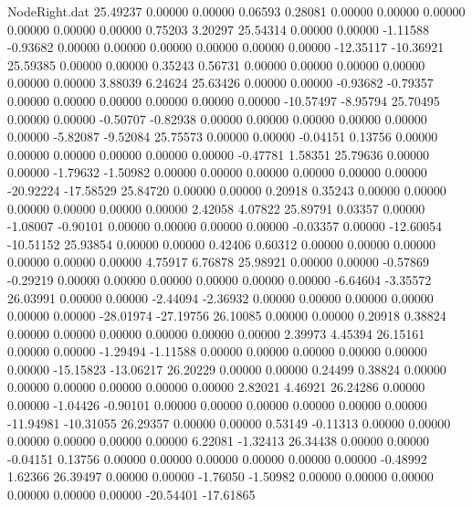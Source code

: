 \begin{filecontents}{NodeRight.dat}
  25.49237    0.00000    0.00000     0.06593    0.28081    0.00000    0.00000    0.00000    0.00000    0.00000    0.00000    0.75203    3.20297
  25.54314    0.00000    0.00000    -1.11588   -0.93682    0.00000    0.00000    0.00000    0.00000    0.00000    0.00000  -12.35117  -10.36921
  25.59385    0.00000    0.00000     0.35243    0.56731    0.00000    0.00000    0.00000    0.00000    0.00000    0.00000    3.88039    6.24624
  25.63426    0.00000    0.00000    -0.93682   -0.79357    0.00000    0.00000    0.00000    0.00000    0.00000    0.00000  -10.57497   -8.95794
  25.70495    0.00000    0.00000    -0.50707   -0.82938    0.00000    0.00000    0.00000    0.00000    0.00000    0.00000   -5.82087   -9.52084
  25.75573    0.00000    0.00000    -0.04151    0.13756    0.00000    0.00000    0.00000    0.00000    0.00000    0.00000   -0.47781    1.58351
  25.79636    0.00000    0.00000    -1.79632   -1.50982    0.00000    0.00000    0.00000    0.00000    0.00000    0.00000  -20.92224  -17.58529
  25.84720    0.00000    0.00000     0.20918    0.35243    0.00000    0.00000    0.00000    0.00000    0.00000    0.00000    2.42058    4.07822
  25.89791    0.03357    0.00000    -1.08007   -0.90101    0.00000    0.00000    0.00000    0.00000   -0.03357    0.00000  -12.60054  -10.51152
  25.93854    0.00000    0.00000     0.42406    0.60312    0.00000    0.00000    0.00000    0.00000    0.00000    0.00000    4.75917    6.76878
  25.98921    0.00000    0.00000    -0.57869   -0.29219    0.00000    0.00000    0.00000    0.00000    0.00000    0.00000   -6.64604   -3.35572
  26.03991    0.00000    0.00000    -2.44094   -2.36932    0.00000    0.00000    0.00000    0.00000    0.00000    0.00000  -28.01974  -27.19756
  26.10085    0.00000    0.00000     0.20918    0.38824    0.00000    0.00000    0.00000    0.00000    0.00000    0.00000    2.39973    4.45394
  26.15161    0.00000    0.00000    -1.29494   -1.11588    0.00000    0.00000    0.00000    0.00000    0.00000    0.00000  -15.15823  -13.06217
  26.20229    0.00000    0.00000     0.24499    0.38824    0.00000    0.00000    0.00000    0.00000    0.00000    0.00000    2.82021    4.46921
  26.24286    0.00000    0.00000    -1.04426   -0.90101    0.00000    0.00000    0.00000    0.00000    0.00000    0.00000  -11.94981  -10.31055
  26.29357    0.00000    0.00000     0.53149   -0.11313    0.00000    0.00000    0.00000    0.00000    0.00000    0.00000    6.22081   -1.32413
  26.34438    0.00000    0.00000    -0.04151    0.13756    0.00000    0.00000    0.00000    0.00000    0.00000    0.00000   -0.48992    1.62366
  26.39497    0.00000    0.00000    -1.76050   -1.50982    0.00000    0.00000    0.00000    0.00000    0.00000    0.00000  -20.54401  -17.61865

\end{filecontents}
